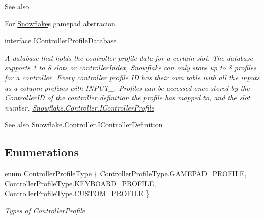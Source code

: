 \begin{DoxyCompactItemize}
\begin{DoxyCompactList}
\begin{DoxySeeAlso}{See also}
\end{DoxySeeAlso}
For \hyperlink{namespace_snowflake}{Snowflake}\textquotesingle{}s gamepad abstracion. \end{DoxyCompactList}\item 
interface \hyperlink{interface_snowflake_1_1_controller_1_1_i_controller_profile_database}{I\+Controller\+Profile\+Database}
\begin{DoxyCompactList}\small\item\em A database that holds the controller profile data for a certain slot. The database supports 1 to 8 slots or \textquotesingle{}controller\+Index\textquotesingle{}, \hyperlink{namespace_snowflake}{Snowflake} can only store up to 8 profiles for a controller. Every controller profile I\+D has their own table with all the inputs as a column prefixes with \textquotesingle{}I\+N\+P\+U\+T\+\_\+\textquotesingle{}. Profiles can be accessed once stored by the Controller\+I\+D of the controller definition the profile has mapped to, and the slot number. \hyperlink{interface_snowflake_1_1_controller_1_1_i_controller_profile}{Snowflake.\+Controller.\+I\+Controller\+Profile} \begin{DoxySeeAlso}{See also}
\hyperlink{interface_snowflake_1_1_controller_1_1_i_controller_definition}{Snowflake.\+Controller.\+I\+Controller\+Definition}


\end{DoxySeeAlso}
\end{DoxyCompactList}\end{DoxyCompactItemize}
\subsection*{Enumerations}
\begin{DoxyCompactItemize}
\item 
enum \hyperlink{namespace_snowflake_1_1_controller_af6896d98053b4f8f2d42c32c6fb05c96}{Controller\+Profile\+Type} \{ \hyperlink{namespace_snowflake_1_1_controller_af6896d98053b4f8f2d42c32c6fb05c96ae9f241ed90f10d7d5bd2db821e559948}{Controller\+Profile\+Type.\+G\+A\+M\+E\+P\+A\+D\+\_\+\+P\+R\+O\+F\+I\+L\+E}, 
\hyperlink{namespace_snowflake_1_1_controller_af6896d98053b4f8f2d42c32c6fb05c96ab8fca83ec4dcb034a3c1a31285bbc432}{Controller\+Profile\+Type.\+K\+E\+Y\+B\+O\+A\+R\+D\+\_\+\+P\+R\+O\+F\+I\+L\+E}, 
\hyperlink{namespace_snowflake_1_1_controller_af6896d98053b4f8f2d42c32c6fb05c96abb8d1b08d5f2d8121aa2d1f026297293}{Controller\+Profile\+Type.\+C\+U\+S\+T\+O\+M\+\_\+\+P\+R\+O\+F\+I\+L\+E}
 \}
\begin{DoxyCompactList}\small\item\em Types of Controller\+Profile \end{DoxyCompactList}\end{DoxyCompactItemize}


